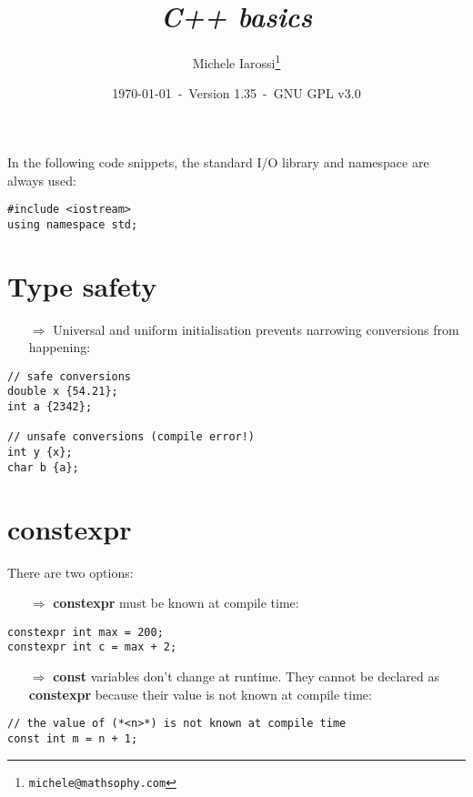 \documentclass[10pt]{article}
\begin{document}
\title{\emph{C++ basics}}
\author{Michele Iarossi\thanks{\texttt{michele@mathsophy.com}}}
\date{\small \today~-~Version 1.35~-~GNU GPL v3.0}


\maketitle

\small

\begin{frame}{}
\setlength\columnsep{1cm}
\begin{multicols}{2}
\tableofcontents
\end{multicols}
\end{frame}

\noindent
In the following code snippets, the standard I/O library and namespace are always used:
\begin{lstlisting}
#include <iostream>
using namespace std;
\end{lstlisting}

\newpage
%
%
\section{Type safety}
\small
\begin{enumerate}
\item[$\Rightarrow$] Universal and uniform initialisation prevents narrowing conversions from happening:
\end{enumerate}
\begin{lstlisting}
// safe conversions
double x {54.21};
int a {2342};

// unsafe conversions (compile error!)
int y {x};
char b {a};
\end{lstlisting}
%
%
\section{constexpr}
\small
There are two options:
\begin{enumerate}
\item[$\Rightarrow$] \textbf{constexpr} must be known at compile time:
\end{enumerate}
\begin{lstlisting}
constexpr int max = 200;
constexpr int c = max + 2;
\end{lstlisting}
\begin{enumerate}
\item[$\Rightarrow$] \textbf{const} variables don't change at runtime. They cannot be declared as
\textbf{constexpr} because their value is not known at compile time:
\end{enumerate}
\begin{lstlisting}
// the value of (*<n>*) is not known at compile time
const int m = n + 1;
\end{lstlisting}
%
%
\end{document}
